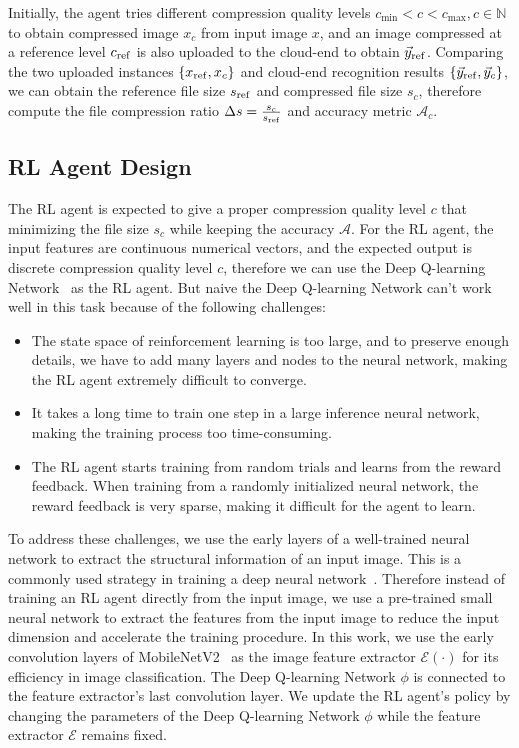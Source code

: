 Initially, the agent tries different compression quality levels $ c_{\min} < c < c_{\max}, c \in \mathbb{N} $ to obtain compressed image $ x_c $ from input image $ x $, and an image compressed at a reference level $ c_{\rm ref} $ is also uploaded to the cloud-end to obtain $ \vec{y}_{\rm ref} $. Comparing the two uploaded instances $ \{x_{\rm ref}, x_c\} $ and cloud-end recognition results $ \{\vec{y}_{\rm ref}, \vec{y}_c\} $, we can obtain the reference file size $ s_{\rm ref} $ and compressed file size $ s_c $, therefore compute the file compression ratio $ \Delta s = \frac{s_c}{s_{\rm ref}} $ and accuracy metric $ \mathcal{A}_c $.

\subsection{RL Agent Design}

The RL agent is expected to give a proper compression quality level $ c $ that minimizing the file size $ s_c $ while keeping the accuracy $ \mathcal{A} $. For the RL agent, the input features are continuous numerical vectors, and the expected output is discrete compression quality level $ c $, therefore we can use the Deep Q-learning Network~ as the RL agent. But naive the Deep Q-learning Network can't work well in this task because of the following challenges: %

\begin{itemize}
    \item The state space of reinforcement learning is too large, and to preserve enough details, we have to add many layers and nodes to the neural network, making the RL agent extremely difficult to converge. 
    \item It takes a long time to train one step in a large inference neural network, making the training process too time-consuming.
    \item The RL agent starts training from random trials and learns from the reward feedback. When training from a randomly initialized neural network, the reward feedback is very sparse, making it difficult for the agent to learn.
\end{itemize}

To address these challenges, we use the early layers of a well-trained neural network to extract the structural information of an input image. This is a commonly used strategy in training a deep neural network~\cite{finetunning,finetunning2}. Therefore instead of training an RL agent directly from the input image, we use a pre-trained small neural network to extract the features from the input image to reduce the input dimension and accelerate the training procedure. In this work, we use the early convolution layers of MobileNetV2~\cite{MobileNetV2} as the image feature extractor $ \mathcal{E}(\cdot) $ for its efficiency in image classification. The Deep Q-learning Network $ \phi $ is connected to the feature extractor's last convolution layer. We update the RL agent's policy by changing the parameters of the Deep Q-learning Network $ \phi $ while the feature extractor $ \mathcal{E} $ remains fixed. %

